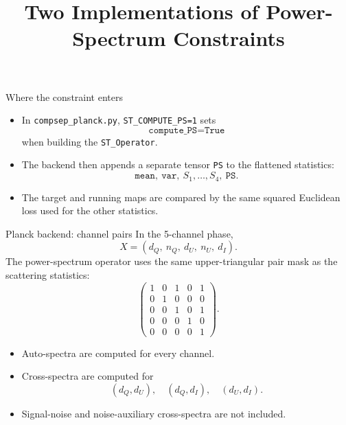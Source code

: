 \documentclass[10pt]{beamer}
\title[Power-Spectrum Constraints]{Two Implementations of Power-Spectrum Constraints}
\author{}
\date{}
\begin{document}
\begin{frame}
  \titlepage
\end{frame}

\begin{frame}{Where the constraint enters}
  \begin{itemize}
    \item In \texttt{compsep\_planck.py}, \texttt{ST\_COMPUTE\_PS=1} sets
    \[
      \texttt{compute\_PS=True}
    \]
    when building the \texttt{ST\_Operator}.

    \item The backend then appends a separate tensor \texttt{PS} to the flattened
    statistics:
    \[
      \texttt{mean},\ \texttt{var},\ S_1,\ldots,S_4,\ \texttt{PS}.
    \]

    \item The target and running maps are compared by the same squared
    Euclidean loss used for the other statistics.
  \end{itemize}
\end{frame}

\begin{frame}{Planck backend: channel pairs}
  In the 5-channel phase,
  \[
    X = (d_Q,\ n_Q,\ d_U,\ n_U,\ d_I).
  \]
  The power-spectrum operator uses the same upper-triangular pair mask as the
  scattering statistics:
  \[
  \begin{pmatrix}
  1&0&1&0&1\\
  0&1&0&0&0\\
  0&0&1&0&1\\
  0&0&0&1&0\\
  0&0&0&0&1
  \end{pmatrix}.
  \]

  \begin{itemize}
    \item Auto-spectra are computed for every channel.
    \item Cross-spectra are computed for
    \[
      (d_Q,d_U),\quad (d_Q,d_I),\quad (d_U,d_I).
    \]
    \item Signal-noise and noise-auxiliary cross-spectra are not included.
  \end{itemize}
\end{frame}
\end{document}
